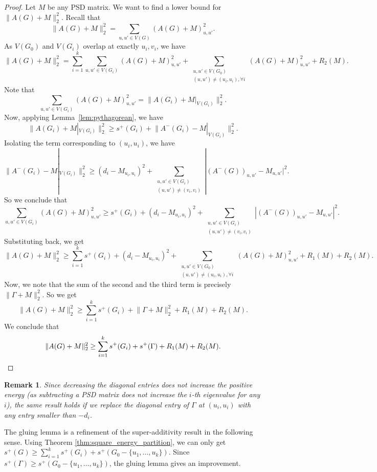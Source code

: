 \documentclass{article}
\newtheorem*{remark}{Remark}
\newcommand{\abs}[1]{|#1|}
\newcommand{\norm}[1]{\lVert#1\rVert}
\begin{document}
\begin{proof}
Let $M$ be any PSD matrix. We want to find a lower bound for $\norm{A(G) + M}_2^2$. Recall that
    \[\norm{A(G) + M}_2^2 = \sum_{u, u' \in V(G)} (A(G) +M)_{u, u'}^2.\]
As $V(G_0)$ and $V(G_i)$ overlap at exactly $u_i, v_i$, we have 
    \[\norm{A(G) + M}_2^2 = \sum_{i = 1}^k \sum_{u, u' \in V(G_i)} (A(G) +M)_{u, u'}^2 + \sum_{\substack{u, u' \in V(G_0) \\ (u, u') \neq (u_i, u_i), \forall i}} (A(G) +M)_{u, u'}^2 + R_2(M).\]
    Note that
    $$\sum_{u, u' \in V(G_i)} (A(G) +M)_{u, u'}^2 = \norm{A(G_i) + M|_{V(G_i)}}_2^2.$$
    Now, applying Lemma~\ref{lem:pythagorean}, we have
    $$\norm{A(G_i) + M|_{V(G_i)}}_2^2 \geq s^+(G_i) + \norm{A^-(G_i) - M|_{V(G_i)}}_2^2.$$
    Isolating the term corresponding to $(u_i, u_i)$, we have
    \[\norm{A^-({G_i}) - M|_{V(G_i)}}_2^2 \geq (d_i - M_{u_i, u_i})^2 + \sum_{\substack{u, u' \in V(G_i) \\ (u, u') \neq (v_i, v_i)}} \abs{(A^-(G))_{u, u'} - M_{u, u'}}^2.\]    
    So we conclude that
    \[\sum_{u, u' \in V(G_i)} (A(G) +M)_{u, u'}^2 \geq s^+(G_i) + (d_i - M_{u_i, u_i})^2 + \sum_{\substack{u, u' \in V(G_i) \\ (u, u') \neq (v_i, v_i)}} \abs{(A^-(G))_{u, u'} - M_{u, u'}}^2.\]
    Substituting back, we get
    \[\norm{A(G) + M}_2^2 \geq \sum_{i = 1}^k s^+(G_i) + (d_i - M_{u_i, u_i})^2 + \sum_{\substack{u, u' \in V(G_0) \\ (u, u') \neq (u_i, u_i), \forall i}} (A(G) +M)_{u, u'}^2 + R_1(M) + R_2(M).\]
    Now, we note that the sum of the second and the third term is precisely $\norm{\Gamma + M}_2^2$. So we get
    \[\norm{A(G) + M}_2^2 \geq \sum_{i = 1}^k s^+(G_i) + \norm{\Gamma + M}_2^2 + R_1(M) + R_2(M).\]
   We conclude that
    \[\norm{A(G) + M}_2^2 \geq \sum_{i = 1}^k s^+(G_i) + s^+(\Gamma) + R_1(M) + R_2(M). \qedhere\]\end{proof}

\begin{remark}
Since decreasing the diagonal entries does not increase the positive energy (as subtracting a PSD matrix does not increase the $i$-th eigenvalue for any $i$), the same result holds if we replace the diagonal entry of $\Gamma$ at $(u_i, u_i)$ with any entry smaller than $-d_i$. 
\end{remark}

The gluing lemma is a refinement of the super-additivity result in the following sense. Using Theorem \ref{thm:square_energy_partition}, we can only get  $s^+(G) \geq  \sum_{i = 1}^k s^+(G_i) + s^+(G_0 - \{u_1, \ldots, u_k\})$. Since $s^+(\Gamma)\ge s^+(G_0 - \{u_1, \ldots, u_k\})$, the gluing lemma gives an improvement. 
\end{document}
